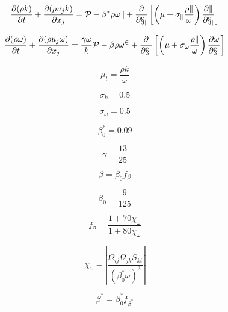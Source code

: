 

\begin{equation}
\frac{\partial (\rho k)}{\partial t} + \frac{\partial (\rho u_j k)}{\partial x_j}
  = \cal P - \beta^* \rho \omega k  + \frac{\partial}{\partial x_j}
  \left[\left(\mu + \sigma_k \frac{\rho k}{\omega} \right)\frac{\partial k}{\partial x_j}\right]
\end{equation}

\begin{equation}
\frac{\partial (\rho \omega)}{\partial t} + \frac{\partial (\rho u_j \omega)}{\partial x_j}
  = \frac{\gamma \omega}{k} \cal P -
  \beta \rho \omega^2 + \frac{\partial}{\partial x_j}
  \left[ \left( \mu + \sigma_{\omega} \frac{\rho k}{\omega} \right)
  \frac{\partial \omega}{\partial x_j} \right]
\end{equation}

\begin{equation}
\mu_t = \frac{\rho k}{\omega}
\end{equation}

\begin{equation}
\sigma_k = 0.5
\end{equation}

\begin{equation}
\sigma_{\omega} = 0.5
\end{equation}

\begin{equation}
\beta_0^* = 0.09
\end{equation}

\begin{equation}
\gamma = \frac{13}{25}
\end{equation}

\begin{equation}
\beta = \beta_0 f_{\beta}
\end{equation}

\begin{equation}
\beta_0 = \frac{9}{125}
\end{equation}

\begin{equation}
f_{\beta} = \frac{1 + 70 \chi_{\omega}}{1 + 80 \chi_{\omega}}
\end{equation}

\begin{equation}
\chi_{\omega} = \left| \frac{\Omega_{ij} \Omega_{jk} S_{ki}}
  {(\beta_0^* \omega)^3} \right|
\end{equation}

\begin{equation}
\beta^* = \beta_0^* f_{\beta^*}
\end{equation}

